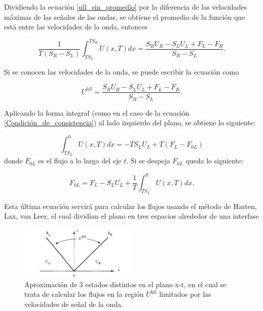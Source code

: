 \documentclass[12pt,a4paper]{book}
\begin{document}
\noindent Dividiendo la ecuación \ref{ull_sin_promedio} por la diferencia de las velocidades máximas de las señales de las ondas, se obtiene el promedio de la función que está entre las velocidades de la onda, entonces

\begin{equation}
\frac{1}{T \left( S_R -S_L \right)}\int_{T S_L}^{T S_R} U \left(x, T \right)dx =
\frac{S_R U_R - S_L U_L + F_L - F_R}{S_R - S_L}.
\end{equation}

\noindent Si se conocen las velocidades de la onda, se puede escribir la ecuación como 

\begin{equation}\label{u_hll}
U^{hll} = \frac{S_R U_R - S_L U_L + F_L - F_R}{S_R - S_L}.
\end{equation}

\noindent Aplicando la forma integral (como en el caso de la ecuación \ref{Condición_de_consistencia}) al lado izquierdo del plano, se obtiene lo siguiente:

\begin{equation}
\int_{T S_L}^{0} U\left( x, T \right) dx = 
-T S_L U_L+T \left( F_L- F_{0L} \right)
\end{equation}
donde $F_{0L}$ es el flujo a lo largo del eje $t$. Si se despeja $F_{0L}$ queda lo siguiente:

\begin{equation}\label{ec F_0L}
F_{0L} = F_L - S_L U_L + \frac{1}{T}  \int_{T S_L}^{0} U\left( x, T \right) dx.
\end{equation}

\noindent Esta última ecuación servirá para calcular los flujos usando el método de Harten, Lax, van Leer, el cual dividían el plano en tres espacios alrededor de una interfase

\begin{figure} %
  \centering
    \includegraphics[width=0.5\textwidth]{Figuras/HLL.png}
  \caption{Aproximación de 3 estados distintos en el plano x-t, en el cual se trata de calcular los flujos en la región $U^{\text{hll}}$ limitados por las velocidades de señal de la onda.}
  \label{fig:HLL}
\end{figure}
\end{document}
